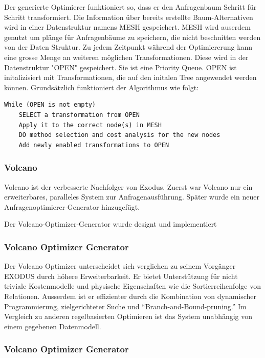 Der generierte Optimierer funktioniert so, dass er den Anfragenbaum Schritt für Schritt transformiert. Die Information über bereits erstellte Baum-Alternativen wird in einer Datenstruktur namens MESH gespeichert. MESH wird auserdem genutzt um plänge für Anfragenbäume zu speichern, die nicht beschnitten werden von der Daten Struktur. Zu jedem Zeitpunkt während der Optimiererung kann eine grosse Menge an weiteren möglichen Transformationen. Diese wird in der Datenstruktur "OPEN" gespeichert. Sie ist eine Priority Queue. OPEN ist initalizisiert mit Transformationen, die auf den initalen Tree angewendet werden können. Grundsätzlich funktioniert der Algorithmus wie folgt:

\begin{lstlisting}[caption={Exekution in EXODUS}]
While (OPEN is not empty)
	SELECT a transformation from OPEN
	Apply it to the correct node(s) in MESH
	DO method selection and cost analysis for the new nodes
	Add newly enabled transformations to OPEN

\end{lstlisting}

\subsubsection{Volcano}

Volcano ist der verbesserte Nachfolger von Exodus. Zuerst war Volcano nur ein erweiterbares, paralleles System zur Anfragenausführung. Später wurde ein neuer Anfragenoptimierer-Generator hinzugefügt. 

Der Volcano-Optimizer-Generator wurde designt und implementiert 





\subsubsection{Volcano Optimizer Generator}

Der Volcano Optimizer unterscheidet sich verglichen zu seinem Vorgänger EXODUS durch höhere Erweiterbarkeit. Er bietet Unterstützung für nicht triviale Kostenmodelle und physische Eigenschaften wie die Sortierreihenfolge von Relationen. Ausserdem ist er effizienter durch die Kombination von dynamischer Programmierung, zielgerichteter Suche und “Branch-and-Bound-pruning.” Im Vergleich zu anderen regelbasierten Optimieren ist das System unabhängig von einem gegebenen Datenmodell.

\subsubsection{Volcano Optimizer Generator}

